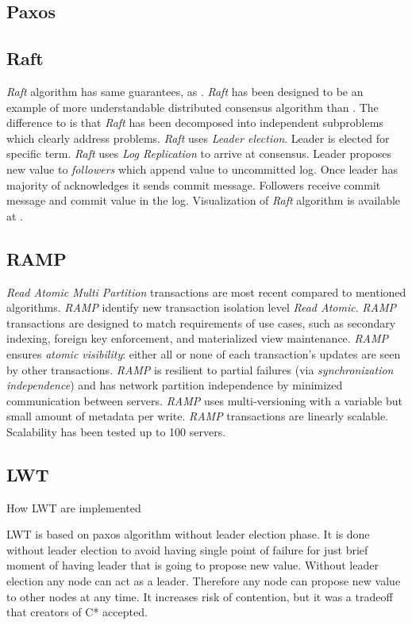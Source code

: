 \subsection{Paxos}

\subsection{Raft}
\emph{Raft} algorithm has same guarantees, as \paxos. \emph{Raft} has been designed to be an example of more understandable distributed consensus algorithm than \paxos. \cite{ongaro2014search} The difference to \paxos  is that \emph{Raft} has been decomposed into independent subproblems which clearly address problems. \emph{Raft} uses \emph{Leader election}. Leader is elected for specific term. \emph{Raft} uses \emph{Log Replication} to arrive at consensus. Leader proposes new value to \emph{followers} which append value to uncommitted log. Once leader has majority of acknowledges it sends commit message. Followers receive commit message and commit value in the log. Visualization of \emph{Raft} algorithm is available at \cite{raftVisual}.

\subsection{RAMP}\label{sec:theory:transactions:ramp}
\emph{Read Atomic Multi Partition} transactions \cite{Bailis:2014} are most recent compared to mentioned algorithms. \emph{RAMP} identify new transaction isolation level \emph{Read Atomic}. \emph{RAMP} transactions are designed to match requirements of use cases, such as secondary indexing, foreign key
enforcement, and materialized view maintenance. \emph{RAMP} ensures \emph{atomic visibility}: either all or none of each transaction's updates are seen by other transactions. \emph{RAMP} is resilient to partial failures (via \emph{synchronization independence}) and has network partition independence by minimized communication between servers. \emph{RAMP} uses multi-versioning with a variable but small amount of metadata per write. \emph{RAMP} transactions are linearly scalable. Scalability has been tested up to 100 servers.

\subsection{LWT}\label{sec:theory:transactions:lwt}

 How LWT are implemented


LWT is based on paxos algorithm without leader election phase. It is done without leader election to avoid having single point of failure for just brief moment of having leader that is going to propose new value. Without leader election any node can act as a leader. Therefore any node can propose new value to other nodes at any time. It increases risk of contention, but it was a tradeoff that creators of C* accepted. 


